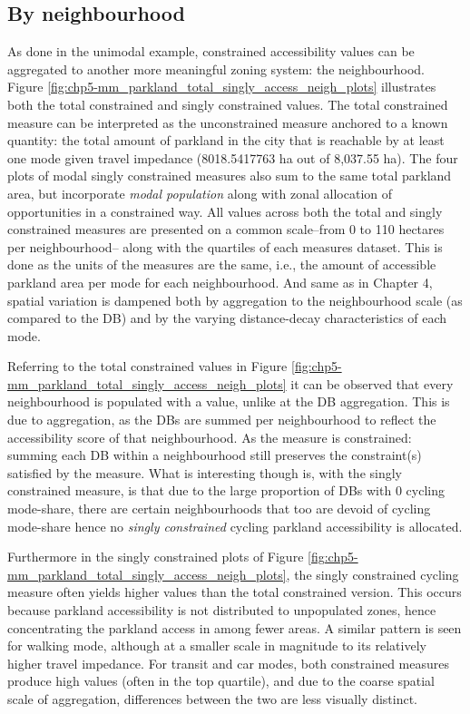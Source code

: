 \documentclass[
11pt, %
oneside, %
english, %
singlespacing, %
]{macthesis} %
\begin{document}
\subsection{By neighbourhood}\label{by-neighbourhood}

As done in the unimodal example, constrained accessibility values can be aggregated to another more meaningful zoning system: the neighbourhood. Figure \ref{fig:chp5-mm_parkland_total_singly_access_neigh_plots} illustrates both the total constrained and singly constrained values. The total constrained measure can be interpreted as the unconstrained measure anchored to a known quantity: the total amount of parkland in the city that is reachable by at least one mode given travel impedance (8018.5417763 ha out of 8,037.55 ha). The four plots of modal singly constrained measures also sum to the same total parkland area, but incorporate \emph{modal population} along with zonal allocation of opportunities in a constrained way. All values across both the total and singly constrained measures are presented on a common scale--from 0 to 110 hectares per neighbourhood-- along with the quartiles of each measures dataset. This is done as the units of the measures are the same, i.e., the amount of accessible parkland area per mode for each neighbourhood. And same as in Chapter 4, spatial variation is dampened both by aggregation to the neighbourhood scale (as compared to the DB) and by the varying distance-decay characteristics of each mode.

Referring to the total constrained values in Figure \ref{fig:chp5-mm_parkland_total_singly_access_neigh_plots} it can be observed that every neighbourhood is populated with a value, unlike at the DB aggregation. This is due to aggregation, as the DBs are summed per neighbourhood to reflect the accessibility score of that neighbourhood. As the measure is constrained: summing each DB within a neighbourhood still preserves the constraint(s) satisfied by the measure. What is interesting though is, with the singly constrained measure, is that due to the large proportion of DBs with 0 cycling mode-share, there are certain neighbourhoods that too are devoid of cycling mode-share hence no \emph{singly constrained} cycling parkland accessibility is allocated.

Furthermore in the singly constrained plots of Figure \ref{fig:chp5-mm_parkland_total_singly_access_neigh_plots}, the singly constrained cycling measure often yields higher values than the total constrained version. This occurs because parkland accessibility is not distributed to unpopulated zones, hence concentrating the parkland access in among fewer areas. A similar pattern is seen for walking mode, although at a smaller scale in magnitude to its relatively higher travel impedance. For transit and car modes, both constrained measures produce high values (often in the top quartile), and due to the coarse spatial scale of aggregation, differences between the two are less visually distinct.
\end{document}
